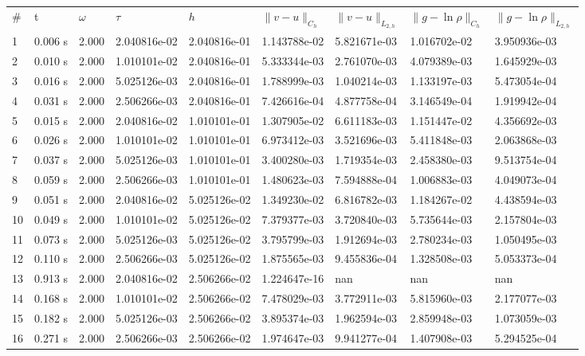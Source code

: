 \documentclass[12pt]{article}
\begin{document}
\begin{center}
\begin{tabular}{lllllllll}
\# & t & $\omega$ & $\tau$ & $h$ & $\|v - u\|_{C_h}$ & $\|v - u\|_{L_{2,h}}$ & $\|g - \ln\rho\|_{C_h}$ & $\|g - \ln\rho\|_{L_{2,h}}$ \\

1&      0.006 s&      2.000&      2.040816e-02&      2.040816e-01&      1.143788e-02&      5.821671e-03&      1.016702e-02&      3.950936e-03\\
2&      0.010 s&      2.000&      1.010101e-02&      2.040816e-01&      5.333344e-03&      2.761070e-03&      4.079389e-03&      1.645929e-03\\
3&      0.016 s&      2.000&      5.025126e-03&      2.040816e-01&      1.788999e-03&      1.040214e-03&      1.133197e-03&      5.473054e-04\\
4&      0.031 s&      2.000&      2.506266e-03&      2.040816e-01&      7.426616e-04&      4.877758e-04&      3.146549e-04&      1.919942e-04\\
5&      0.015 s&      2.000&      2.040816e-02&      1.010101e-01&      1.307905e-02&      6.611183e-03&      1.151447e-02&      4.356692e-03\\
6&      0.026 s&      2.000&      1.010101e-02&      1.010101e-01&      6.973412e-03&      3.521696e-03&      5.411848e-03&      2.063868e-03\\
7&      0.037 s&      2.000&      5.025126e-03&      1.010101e-01&      3.400280e-03&      1.719354e-03&      2.458380e-03&      9.513754e-04\\
8&      0.059 s&      2.000&      2.506266e-03&      1.010101e-01&      1.480623e-03&      7.594888e-04&      1.006883e-03&      4.049073e-04\\
9&      0.051 s&      2.000&      2.040816e-02&      5.025126e-02&      1.349230e-02&      6.816782e-03&      1.184267e-02&      4.438594e-03\\
10&      0.049 s&      2.000&      1.010101e-02&      5.025126e-02&      7.379377e-03&      3.720840e-03&      5.735644e-03&      2.157804e-03\\
11&      0.073 s&      2.000&      5.025126e-03&      5.025126e-02&      3.795799e-03&      1.912694e-03&      2.780234e-03&      1.050495e-03\\
12&      0.110 s&      2.000&      2.506266e-03&      5.025126e-02&      1.875565e-03&      9.455836e-04&      1.328508e-03&      5.053373e-04\\
13&      0.913 s&      2.000&      2.040816e-02&      2.506266e-02&      1.224647e-16&      nan&      nan&      nan\\
14&      0.168 s&      2.000&      1.010101e-02&      2.506266e-02&      7.478029e-03&      3.772911e-03&      5.815960e-03&      2.177077e-03\\
15&      0.182 s&      2.000&      5.025126e-03&      2.506266e-02&      3.895374e-03&      1.962594e-03&      2.859948e-03&      1.073059e-03\\
16&      0.271 s&      2.000&      2.506266e-03&      2.506266e-02&      1.974647e-03&      9.941277e-04&      1.407908e-03&      5.294525e-04\\


\end{tabular}
\end{center}
\end{document}
